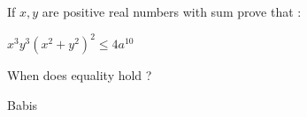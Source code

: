 If $ x,y$ are positive real numbers with sum  prove that :


$ x^3y^3(x^2+y^2)^2 \leq 4a^{10}$

When does equality hold ?

Babis